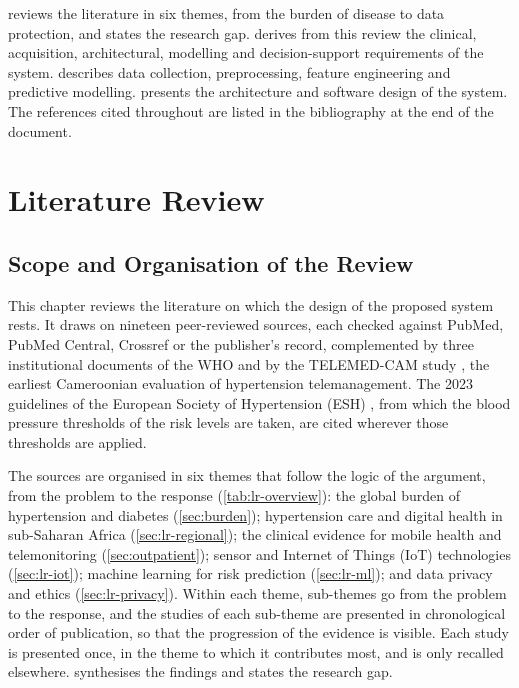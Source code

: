 \documentclass[12pt,a4paper,oneside]{report}
\begin{document}
 reviews the literature in six themes, from the burden of disease to data protection, and states the research gap.  derives from this review the clinical, acquisition, architectural, modelling and decision-support requirements of the system.  describes data collection, preprocessing, feature engineering and predictive modelling.  presents the architecture and software design of the system. The references cited throughout are listed in the bibliography at the end of the document.

\chapter{Literature Review}\label{ch:litreview}\label{ch:background}

\section*{Scope and Organisation of the Review}

This chapter reviews the literature on which the design of the proposed system rests. It draws on nineteen peer-reviewed sources, each checked against PubMed, PubMed Central, Crossref or the publisher's record, complemented by three institutional documents of the WHO \parencite{who2023hypertension,who2021guideline,whoHEARTS} and by the TELEMED-CAM study \parencite{kingue2013}, the earliest Cameroonian evaluation of hypertension telemanagement. The 2023 guidelines of the European Society of Hypertension (ESH) \parencite{mancia2023}, from which the blood pressure thresholds of the risk levels are taken, are cited wherever those thresholds are applied.

The sources are organised in six themes that follow the logic of the argument, from the problem to the response (\cref{tab:lr-overview}): the global burden of hypertension and diabetes (\cref{sec:burden}); hypertension care and digital health in sub-Saharan Africa (\cref{sec:lr-regional}); the clinical evidence for mobile health and telemonitoring (\cref{sec:outpatient}); sensor and Internet of Things (IoT) technologies (\cref{sec:lr-iot}); machine learning for risk prediction (\cref{sec:lr-ml}); and data privacy and ethics (\cref{sec:lr-privacy}). Within each theme, sub-themes go from the problem to the response, and the studies of each sub-theme are presented in chronological order of publication, so that the progression of the evidence is visible. Each study is presented once, in the theme to which it contributes most, and is only recalled elsewhere.  synthesises the findings and states the research gap.
\end{document}
